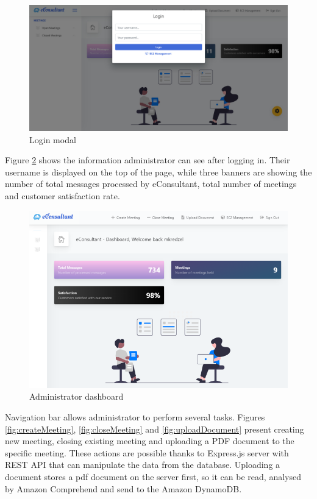 \documentclass{article}
\begin{document}
\begin{figure}[H]
  \centering
  \includegraphics[scale=0.295]{implementation/login.jpg}
  \caption{Login modal}
  \label{fig:login}
\end{figure}

{\large 
Figure \ref{fig:dashboard} shows the information administrator can see after logging in. Their username is displayed on the top of the page, while three banners are showing the number of total messages processed by eConsultant, total number of meetings and customer satisfaction rate.\par
}

\begin{figure}[H]
  \centering
  \includegraphics[scale=0.75]{charts/dashboard.png}
  \caption{Administrator dashboard}
  \label{fig:dashboard}
\end{figure}

{\large 
Navigation bar allows administrator to perform several tasks. Figures \ref{fig:createMeeting}, \ref{fig:closeMeeting} and \ref{fig:uploadDocument} present creating new meeting, closing existing meeting and uploading a PDF document to the specific meeting. These actions are possible thanks to Express.js server with REST API that can manipulate the data from the database. Uploading a document stores a pdf document on the server first, so it can be read, analysed by Amazon Comprehend and send to the Amazon DynamoDB.\par
}
\end{document}
